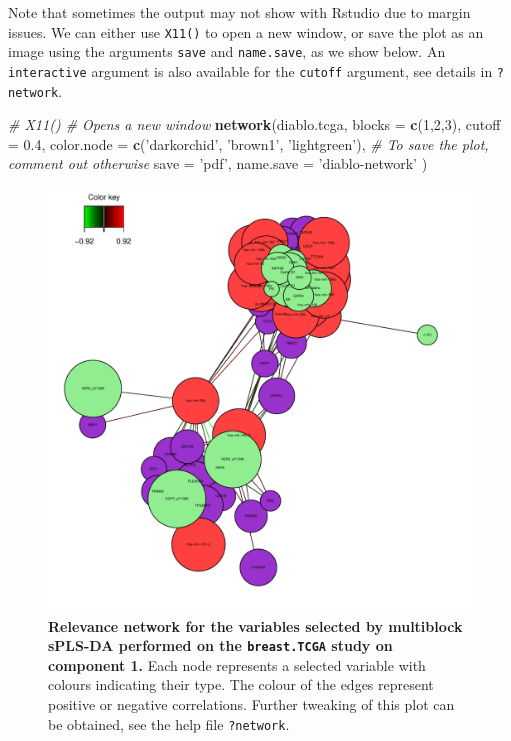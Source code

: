\documentclass[]{book}
\newenvironment{Shaded}{\begin{snugshade}}{\end{snugshade}}
\newcommand{\CommentTok}[1]{\textcolor[rgb]{0.56,0.35,0.01}{\textit{#1}}}
\newcommand{\DataTypeTok}[1]{\textcolor[rgb]{0.13,0.29,0.53}{#1}}
\newcommand{\DecValTok}[1]{\textcolor[rgb]{0.00,0.00,0.81}{#1}}
\newcommand{\FloatTok}[1]{\textcolor[rgb]{0.00,0.00,0.81}{#1}}
\newcommand{\KeywordTok}[1]{\textcolor[rgb]{0.13,0.29,0.53}{\textbf{#1}}}
\newcommand{\NormalTok}[1]{#1}
\newcommand{\StringTok}[1]{\textcolor[rgb]{0.31,0.60,0.02}{#1}}
\begin{document}
Note that sometimes the output may not show with Rstudio due to margin issues. We can either use \texttt{X11()} to open a new window, or save the plot as an image using the arguments \texttt{save} and \texttt{name.save}, as we show below. An \texttt{interactive} argument is also available for the \texttt{cutoff} argument, see details in \texttt{?network}.

\begin{Shaded}
\begin{Highlighting}[]
\CommentTok{# X11()   # Opens a new window}
\KeywordTok{network}\NormalTok{(diablo.tcga, }\DataTypeTok{blocks =} \KeywordTok{c}\NormalTok{(}\DecValTok{1}\NormalTok{,}\DecValTok{2}\NormalTok{,}\DecValTok{3}\NormalTok{), }
        \DataTypeTok{cutoff =} \FloatTok{0.4}\NormalTok{,}
        \DataTypeTok{color.node =} \KeywordTok{c}\NormalTok{(}\StringTok{'darkorchid'}\NormalTok{, }\StringTok{'brown1'}\NormalTok{, }\StringTok{'lightgreen'}\NormalTok{),}
        \CommentTok{# To save the plot, comment out otherwise}
        \DataTypeTok{save =} \StringTok{'pdf'}\NormalTok{, }\DataTypeTok{name.save =} \StringTok{'diablo-network'}
\NormalTok{        )}
\end{Highlighting}
\end{Shaded}

\begin{figure}

{\centering \includegraphics[width=0.5\linewidth]{Figures/DIABLO/diablo-network} 

}

\caption{\textbf{Relevance network for the variables selected by multiblock sPLS-DA performed on the \texttt{breast.TCGA} study on component 1.} Each node represents a selected variable with colours indicating their type. The colour of the edges represent positive or negative correlations. Further tweaking of this plot can be obtained, see the help file \texttt{?network}.}\label{fig:diablo-network}
\end{figure}
\end{document}
